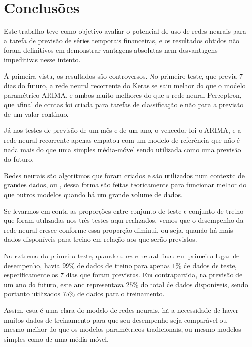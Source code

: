 
\chapter{Conclusões}
\label{cap:conclusoes}

Este trabalho teve como objetivo avaliar o potencial do uso de redes neurais para a tarefa de previsão de séries temporais financeiras, e os resultados obtidos não foram definitivos em demonstrar vantagens absolutas nem desvantagens impeditivas nesse intento.

À primeira vista, os resultados são controversos. No primeiro teste, que previu $7$ dias do futuro, a rede neural recorrente do Keras se saiu melhor do que o modelo paramétrico ARIMA, e ambos muito melhores do que a rede neural Perceptron, que afinal de contas foi criada para tarefas de classificação e não para a previsão de um valor contínuo.

Já nos testes de previsão de um mês e de um ano, o vencedor foi o ARIMA, e a rede neural recorrente apenas empatou com um modelo de referência que não é nada mais do que uma simples média-móvel sendo utilizada como uma previsão do futuro.

Redes neurais são algoritmos que foram criados e são utilizados num contexto de grandes dados, ou , dessa forma são feitas teoricamente para funcionar melhor do que outros modelos quando há um grande volume de dados.

Se levarmos em conta as proporções entre conjunto de teste e conjunto de treino que foram utilizadas nos três testes aqui realizados, vemos que o desempenho da rede neural cresce conforme essa proporção diminui, ou seja, quando há mais dados disponíveis para treino em relação aos que serão previstos. 

No extremo do primeiro teste, quando a rede neural ficou em primeiro lugar de desempenho, havia $99\%$ de dados de treino para apenas $1\%$ de dados de teste, especificamente os $7$ dias que foram previstos. Em contrapartida, na previsão de um ano do futuro, este ano representava $25\%$ do total de dados disponíveis, sendo portanto utilizados $75\%$ de dados para o treinamento.

Assim, esta é uma clara  do modelo de redes neurais, há a necessidade de haver muitos dados de treinamento para que seu desempenho seja comparável ou mesmo melhor do que os modelos paramétricos tradicionais, ou mesmo modelos simples como de uma média-móvel.


